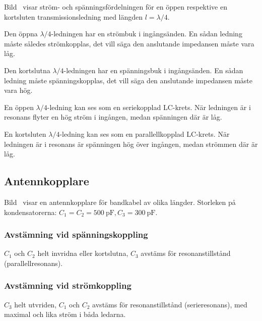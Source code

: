 
Bild~ visar ström- och spänningsfördelningen för en öppen
respektive en kortsluten transmissionsledning med längden \(l = \lambda/4\).

Den öppna \(\lambda/4\)-ledningen har en strömbuk i ingångsänden.
En sådan ledning måste således strömkopplas, det vill säga den anslutande
impedansen måste vara låg.

Den kortslutna \(\lambda/4\)-ledningen har en spänningsbuk i ingångsänden.
En sådan ledning måste spänningskopplas, det vill säga den anslutande
impedansen måste vara hög.

En öppen \(\lambda/4\)-ledning kan ses som en seriekopplad LC-krets.
När ledningen är i resonans flyter en hög ström i ingången, medan spänningen
där är låg.

En kortsluten \(\lambda/4\)-ledning kan ses som en parallellkopplad LC-krets.
När ledningen är i resonans är spänningen hög över ingången, medan strömmen där
är låg.


\newpage
\subsection{Antennkopplare}

Bild~ visar en antennkopplare för bandkabel av olika
längder.
Storleken på kondensatorerna: \(C_1 = C_2 = \qty{500}{\pico\farad}, C_3 =
\qty{300}{\pico\farad}\).

\subsubsection{Avstämning vid spänningskoppling}

\(C_1\) och \(C_2\) helt invridna eller kortslutna, \(C_3\) avstäms
för resonanstillstånd (parallellresonans).

\subsubsection{Avstämning vid strömkoppling}

\(C_3\) helt utvriden, \(C_1\) och \(C_2\) avstäms för
resonanstillstånd (serieresonans), med maximal och lika ström i båda ledarna.

